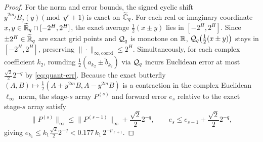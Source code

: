 \begin{proof}
For the norm and error bounds, the signed cyclic shift $y^{2m_j} B_j(y) \pmod{y^r+1}$ is exact on $\widetilde{\mathbb{C}}_q$. For each real or imaginary coordinate $x, y \in \widetilde{\mathbb{R}}_q \cap [-2^H, 2^H]$, the exact average $\frac{1}{2}(x \pm y)$ lies in $[-2^H, 2^H]$. Since $\pm 2^H \in \widetilde{\mathbb{R}}_q$ are exact grid points and $\mathcal{Q}_q$ is monotone on $\mathbb{R}$, $\mathcal{Q}_q\bigl(\frac{1}{2}(x \pm y)\bigr)$ stays in $[-2^H, 2^H]$, preserving $\|\cdot\|_{\infty,\mathrm{coord}} \le 2^H$. Simultaneously, for each complex coefficient $k_2$, rounding $\frac{1}{2}(a_{k_2} \pm \tilde{b}_{k_2})$ via $\mathcal{Q}_q$ incurs Euclidean error at most $\frac{\sqrt{2}}{2} 2^{-q}$ by \eqref{eq:quant-err}. Because the exact butterfly $(A, B) \mapsto \frac{1}{2}(A + y^{2m} B, A - y^{2m} B)$ is a contraction in the complex Euclidean $\ell_\infty$ norm, the stage-$s$ array $P^{(s)}$ and forward error $e_s$ relative to the exact stage-$s$ array satisfy
\[
  \|P^{(s)}\|_\infty \le \|P^{(s-1)}\|_\infty + \frac{\sqrt{2}}{2} 2^{-q}, \qquad e_s \le e_{s-1} + \frac{\sqrt{2}}{2} 2^{-q},
\]
giving $e_{k_1} \le k_1 \frac{\sqrt{2}}{2} 2^{-q} < 0.177 \, k_1 \, 2^{-p_{\ell+1}}$.
\end{proof}
